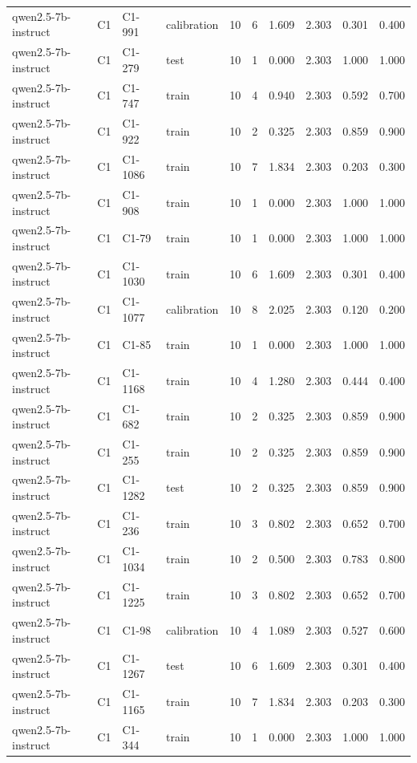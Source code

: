 \begin{table}
\begin{tabular}{llllrrrrrr}
qwen2.5-7b-instruct & C1 & C1-991 & calibration & 10 & 6 & 1.609 & 2.303 & 0.301 & 0.400 \\
qwen2.5-7b-instruct & C1 & C1-279 & test & 10 & 1 & 0.000 & 2.303 & 1.000 & 1.000 \\
qwen2.5-7b-instruct & C1 & C1-747 & train & 10 & 4 & 0.940 & 2.303 & 0.592 & 0.700 \\
qwen2.5-7b-instruct & C1 & C1-922 & train & 10 & 2 & 0.325 & 2.303 & 0.859 & 0.900 \\
qwen2.5-7b-instruct & C1 & C1-1086 & train & 10 & 7 & 1.834 & 2.303 & 0.203 & 0.300 \\
qwen2.5-7b-instruct & C1 & C1-908 & train & 10 & 1 & 0.000 & 2.303 & 1.000 & 1.000 \\
qwen2.5-7b-instruct & C1 & C1-79 & train & 10 & 1 & 0.000 & 2.303 & 1.000 & 1.000 \\
qwen2.5-7b-instruct & C1 & C1-1030 & train & 10 & 6 & 1.609 & 2.303 & 0.301 & 0.400 \\
qwen2.5-7b-instruct & C1 & C1-1077 & calibration & 10 & 8 & 2.025 & 2.303 & 0.120 & 0.200 \\
qwen2.5-7b-instruct & C1 & C1-85 & train & 10 & 1 & 0.000 & 2.303 & 1.000 & 1.000 \\
qwen2.5-7b-instruct & C1 & C1-1168 & train & 10 & 4 & 1.280 & 2.303 & 0.444 & 0.400 \\
qwen2.5-7b-instruct & C1 & C1-682 & train & 10 & 2 & 0.325 & 2.303 & 0.859 & 0.900 \\
qwen2.5-7b-instruct & C1 & C1-255 & train & 10 & 2 & 0.325 & 2.303 & 0.859 & 0.900 \\
qwen2.5-7b-instruct & C1 & C1-1282 & test & 10 & 2 & 0.325 & 2.303 & 0.859 & 0.900 \\
qwen2.5-7b-instruct & C1 & C1-236 & train & 10 & 3 & 0.802 & 2.303 & 0.652 & 0.700 \\
qwen2.5-7b-instruct & C1 & C1-1034 & train & 10 & 2 & 0.500 & 2.303 & 0.783 & 0.800 \\
qwen2.5-7b-instruct & C1 & C1-1225 & train & 10 & 3 & 0.802 & 2.303 & 0.652 & 0.700 \\
qwen2.5-7b-instruct & C1 & C1-98 & calibration & 10 & 4 & 1.089 & 2.303 & 0.527 & 0.600 \\
qwen2.5-7b-instruct & C1 & C1-1267 & test & 10 & 6 & 1.609 & 2.303 & 0.301 & 0.400 \\
qwen2.5-7b-instruct & C1 & C1-1165 & train & 10 & 7 & 1.834 & 2.303 & 0.203 & 0.300 \\
qwen2.5-7b-instruct & C1 & C1-344 & train & 10 & 1 & 0.000 & 2.303 & 1.000 & 1.000 \\

\end{tabular}
\end{table}
